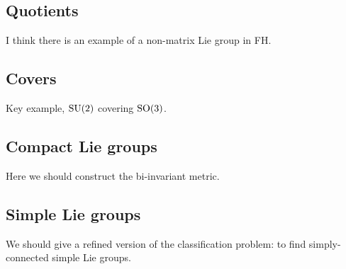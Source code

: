 \subsection{Quotients}

I think there is an example of a non-matrix Lie group in FH.

\subsection{Covers}

Key example, $\mathrm{SU}(2)$ covering $\mathrm{SO}(3)$.


\subsection{Compact Lie groups}

Here we should construct the bi-invariant metric.


\subsection{Simple Lie groups}
We should give a refined version of the classification problem: to find simply-connected simple Lie groups.
